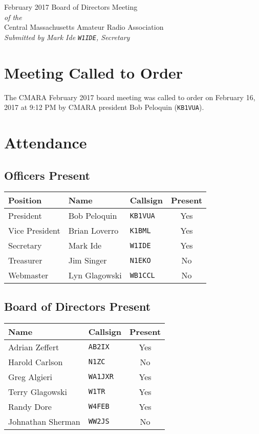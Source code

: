 \documentclass[10pt,letterpaper]{article}
\begin{document}
\begin{center}
{\huge February 2017 Board of Directors Meeting}\\
\emph{of the}\\
{\Large Central Massachusetts Amateur Radio Association}\\
\emph{Submitted by Mark Ide \texttt{W1IDE}, Secretary}
\end{center}

\section{Meeting Called to Order}
The CMARA February 2017 board meeting was called to order on February 16, 2017 at 9:12 PM by CMARA president Bob Peloquin (\texttt{KB1VUA}).

\section{Attendance}

\subsection{Officers Present}
\begin{tabular}{|l|l|l|c|}
  \hline
  \textbf{Position} & \textbf{Name}  & \textbf{Callsign} & \textbf{Present} \\ \hline
  President         & Bob Peloquin   & \texttt{KB1VUA}   & Yes \\
  Vice President    & Brian Loverro  & \texttt{K1BML}    & Yes \\
  Secretary         & Mark Ide       & \texttt{W1IDE}    & Yes \\
  Treasurer         & Jim Singer     & \texttt{N1EKO}    & No  \\
  Webmaster         & Lyn Glagowski  & \texttt{WB1CCL}   & No  \\
  \hline
\end{tabular}

\subsection{Board of Directors Present}
\begin{tabular}{|l|l|c|}
  \hline
  \textbf{Name}     & \textbf{Callsign} & \textbf{Present} \\ \hline
  Adrian Zeffert    & \texttt{AB2IX}    & Yes \\
  Harold Carlson    & \texttt{N1ZC}     & No  \\
  Greg Algieri      & \texttt{WA1JXR}   & Yes \\
  Terry Glagowski   & \texttt{W1TR}     & Yes \\
  Randy Dore        & \texttt{W4FEB}    & Yes \\
  Johnathan Sherman & \texttt{WW2JS}    & No  \\
  \hline
\end{tabular}
\end{document}
